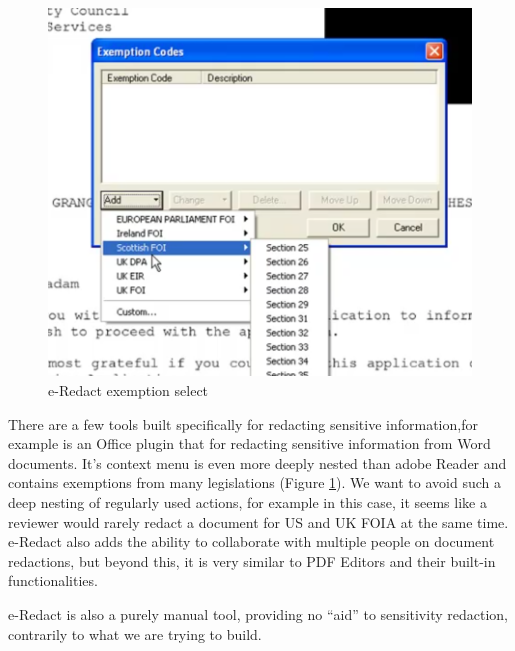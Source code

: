 \documentclass{l4proj}
\begin{document}
\begin{figure}
    \includegraphics[width=\linewidth]{images/related_products/eredact_dropdown.png}
    \caption{e-Redact exemption select}
    \vspace{-17pt}
    \label{fig:eredact-dropdown}
\end{figure}

There are a few tools built specifically for redacting sensitive information,for example \textcite{ERedact} is an Office plugin that for redacting sensitive information from Word documents.
It's context menu is even more deeply nested than adobe Reader and contains exemptions from many legislations (Figure \ref{fig:eredact-dropdown}).
We want to avoid such a deep nesting of regularly used actions, for example in this case, it seems like a reviewer would rarely redact a document for US and UK FOIA at the same time.
e-Redact also adds the ability to collaborate with multiple people on document redactions, but beyond this, it is very similar to PDF Editors and their built-in functionalities.

e-Redact is also a purely manual tool, providing no ``aid'' to sensitivity redaction, contrarily to what we are trying to build.
\end{document}
